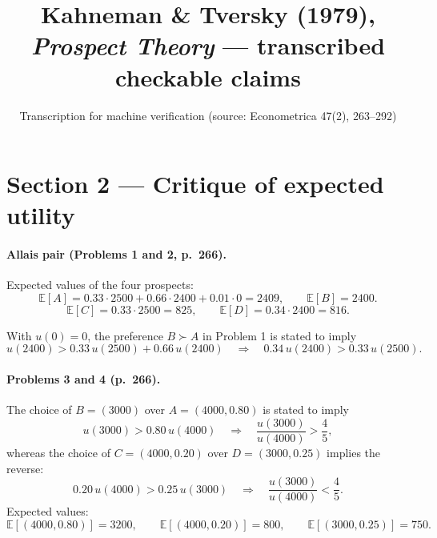 \documentclass[11pt]{article}
\title{Kahneman \& Tversky (1979), \emph{Prospect Theory} --- transcribed checkable claims}
\author{Transcription for machine verification (source: Econometrica 47(2), 263--292)}
\date{}
\begin{document}
\maketitle

\section{Section 2 --- Critique of expected utility}

\paragraph{Allais pair (Problems 1 and 2, p.~266).}
Expected values of the four prospects:
\begin{equation}\label{eq:p1-ev-A}
\mathbb{E}[A] = 0.33 \cdot 2500 + 0.66 \cdot 2400 + 0.01 \cdot 0 = 2409, \qquad \mathbb{E}[B] = 2400 .
\end{equation}
\begin{equation}\label{eq:p2-ev}
\mathbb{E}[C] = 0.33 \cdot 2500 = 825, \qquad \mathbb{E}[D] = 0.34 \cdot 2400 = 816 .
\end{equation}

With $u(0)=0$, the preference $B \succ A$ in Problem 1 is stated to imply
\begin{equation}\label{eq:allais-eu}
u(2400) > 0.33\,u(2500) + 0.66\,u(2400)
\quad\Longrightarrow\quad
0.34\,u(2400) > 0.33\,u(2500).
\end{equation}

\paragraph{Problems 3 and 4 (p.~266).}
The choice of $B=(3000)$ over $A=(4000,0.80)$ is stated to imply
\begin{equation}\label{eq:p3-ratio}
u(3000) > 0.80\,u(4000)
\quad\Longrightarrow\quad
\frac{u(3000)}{u(4000)} > \frac{4}{5},
\end{equation}
whereas the choice of $C=(4000,0.20)$ over $D=(3000,0.25)$ implies the reverse:
\begin{equation}\label{eq:p4-ratio}
0.20\,u(4000) > 0.25\,u(3000)
\quad\Longrightarrow\quad
\frac{u(3000)}{u(4000)} < \frac{4}{5}.
\end{equation}
Expected values:
\begin{equation}\label{eq:p34-ev}
\mathbb{E}[(4000,0.80)] = 3200, \qquad \mathbb{E}[(4000,0.20)] = 800, \qquad \mathbb{E}[(3000,0.25)] = 750 .
\end{equation}
\end{document}
